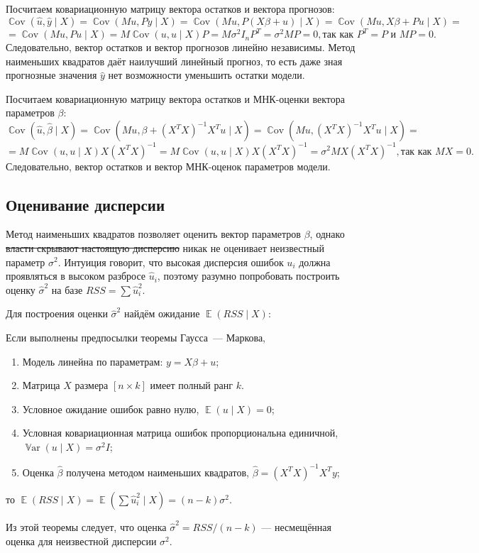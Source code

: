 \documentclass[12pt]{article}
\DeclareMathOperator{\Cov}{\mathbb{C}ov}
\DeclareMathOperator{\Var}{\mathbb{V}ar}
\DeclareMathOperator{\E}{\mathbb{E}}
\newcommand{\hb}{\hat{\beta}}
\newcommand{\hu}{\hat{u}}
\newcommand{\hy}{\hat{y}}
\newcommand{\RSS}{RSS}
\newcommand{\gaussmarkov}{
\begin{enumerate}[label=\arabic*.]
    \item Модель линейна по параметрам: $y = X\beta + u$;
    \item Матрица $X$ размера $[n \times k]$ имеет полный ранг $k$.
    \item Условное ожидание ошибок равно нулю, $\E(u\mid X) = 0$;
    \item Условная ковариационная матрица ошибок пропорциональна единичной, $\Var(u\mid X) = \sigma^2 I$;
    \item Оценка $\hb$ получена методом наименьших квадратов, $\hb = (X^T X)^{-1}X^T y$;
\end{enumerate}}
\begin{document}
Посчитаем ковариационную матрицу вектора остатков и вектора прогнозов:
\[
\Cov(\hu, \hy \mid X) = \Cov(M u, Py \mid X) = \Cov(M u, P(X\beta + u) \mid X) = \Cov(M u, X\beta + Pu \mid X) =
\]
\[
=\Cov(Mu, Pu \mid X) = M \Cov(u,u \mid X) P = M \sigma^2I_n P^{T} = \sigma^2MP = 0, \text{так как } P^{T} = P \text{ и } MP = 0.
\]
Следовательно, вектор остатков и вектор прогнозов линейно независимы. Метод наименьших квадратов даёт наилучший линейный прогноз, то есть даже зная прогнозные значения $\hy$ нет возможности уменьшить остатки модели.

Посчитаем ковариационную матрицу вектора остатков и МНК-оценки вектора параметров $\beta$:
\[
\Cov(\hu, \hb \mid X) = \Cov(M u, \beta + (X^{T}X)^{-1}X^{T}u \mid X) = \Cov(Mu,(X^{T}X)^{-1}X^{T}u \mid X) = 
\]
\[
=M\Cov(u, u \mid X) X(X^{T}X)^{-1} = M\Cov(u,u \mid X) X(X^{T}X)^{-1} = \sigma^2 MX(X^{T}X)^{-1}, \text{так как } MX = 0.
\]
Следовательно, вектор остатков и вектор МНК-оценок параметров модели.

\subsection{Оценивание дисперсии}

Метод наименьших квадратов позволяет оценить вектор параметров $\beta$, однако \sout{власти скрывают настоящую дисперсию} никак не оценивает неизвестный параметр $\sigma^2$.
Интуиция говорит, что высокая дисперсия ошибок $u_i$ должна проявляться в высоком разбросе $\hat u_i$, поэтому разумно попробовать построить оценку $\hat\sigma^2$ на базе $\RSS = \sum \hat u_i^2$.

Для построения оценки $\hat\sigma^2$ найдём ожидание $\E(\RSS \mid X)$:
\begin{theorem}
Если выполнены предпосылки теоремы Гаусса~— Маркова, 
\gaussmarkov
то $\E(\RSS \mid X) = \E(\sum \hu_i^2 \mid X) = (n - k) \sigma^2$.
\end{theorem}
Из этой теоремы следует, что оценка $\hat \sigma^2 = \RSS/ (n - k)$ — несмещённая оценка для неизвестной дисперсии $\sigma^2$.
\end{document}

